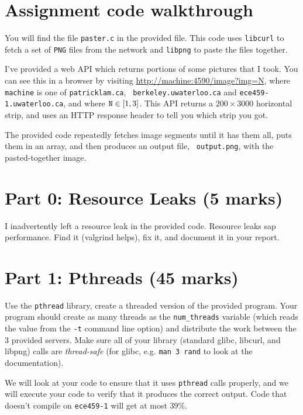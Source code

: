 \documentclass[letterpaper,10pt]{article}
\begin{document}
\section*{Assignment code walkthrough}

You will find the file {\tt paster.c} in the provided file. This code uses
{\tt libcurl} to fetch a set of {\tt PNG} files from the network and {\tt libpng}
to paste the files together.

I've provided a web API which returns portions of some pictures that I took.
You can see this in a browser by visiting
\url{http://machine:4590/image?img=N},
where {\tt machine} is one of {\tt patricklam.ca}, {\tt
  berkeley.uwaterloo.ca} and {\tt ece459-1.uwaterloo.ca}, and where $\mbox{\tt N} \in [1,3]$. This API returns a $200 \times 3000$ horizontal strip, and uses
an HTTP response header to tell you which strip you got.

The provided code repeatedly fetches image segments until it has them
all, puts them in an array, and then produces an output file, {\tt
  output.png}, with the pasted-together image.

\newpage
\section*{Part 0: Resource Leaks (5 marks)}

I inadvertently left a resource leak in the provided code. Resource
leaks sap performance. Find it (valgrind helps), fix it, and document
it in your report.

\section*{Part 1: Pthreads (45 marks)}

Use the {\tt pthread} library, create a threaded version of the
provided program.  Your program should create as many threads as the
{\tt num\_threads} variable (which reads the value from the {\tt -t}
command line option) and distribute the work between the 3 provided
servers. Make sure all of your library (standard glibc, libcurl, and
libpng) calls are {\it thread-safe} (for glibc, e.g. {\tt man 3 rand} to
look at the documentation).  

We will look at your code to ensure that it uses {\tt pthread} calls 
properly, and we will execute your code to verify that it produces the
correct output. Code that doesn't compile on {\tt ece459-1} will get at most
39\%.
\end{document}
